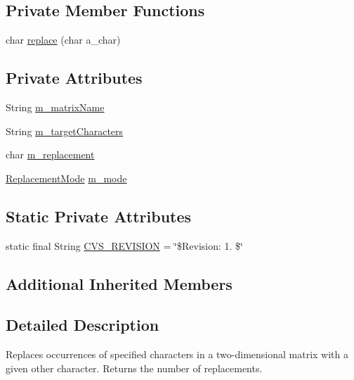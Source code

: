 \subsection*{Private Member Functions}
\begin{DoxyCompactItemize}
\item 
char \hyperlink{classorg_1_1jgap_1_1gp_1_1function_1_1_replace_in_matrix_a190171e36118dcd0ec77efc34d11a74e}{replace} (char a\-\_\-char)
\end{DoxyCompactItemize}
\subsection*{Private Attributes}
\begin{DoxyCompactItemize}
\item 
String \hyperlink{classorg_1_1jgap_1_1gp_1_1function_1_1_replace_in_matrix_a7d4faa65d6b6b40b875647a609882f63}{m\-\_\-matrix\-Name}
\item 
String \hyperlink{classorg_1_1jgap_1_1gp_1_1function_1_1_replace_in_matrix_a65fb8407fa93a6f77cf5f7097a4bf0fe}{m\-\_\-target\-Characters}
\item 
char \hyperlink{classorg_1_1jgap_1_1gp_1_1function_1_1_replace_in_matrix_ac914d2508754df3d14edd2b4b946cb9e}{m\-\_\-replacement}
\item 
\hyperlink{enumorg_1_1jgap_1_1gp_1_1function_1_1_replace_in_matrix_1_1_replacement_mode}{Replacement\-Mode} \hyperlink{classorg_1_1jgap_1_1gp_1_1function_1_1_replace_in_matrix_a749c150c6409342183985395407a18df}{m\-\_\-mode}
\end{DoxyCompactItemize}
\subsection*{Static Private Attributes}
\begin{DoxyCompactItemize}
\item 
static final String \hyperlink{classorg_1_1jgap_1_1gp_1_1function_1_1_replace_in_matrix_aad4cd9e908d09f1fa23ab9f69cd082dc}{C\-V\-S\-\_\-\-R\-E\-V\-I\-S\-I\-O\-N} = \char`\"{}\$Revision\-: 1. \$\char`\"{}
\end{DoxyCompactItemize}
\subsection*{Additional Inherited Members}


\subsection{Detailed Description}
Replaces occurrences of specified characters in a two-\/dimensional matrix with a given other character. Returns the number of replacements.

